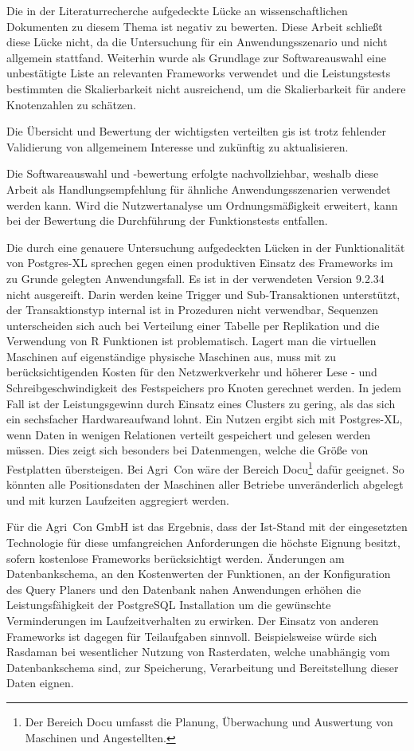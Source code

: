 Die in der Literaturrecherche aufgedeckte Lücke an wissenschaftlichen Dokumenten zu diesem Thema ist negativ zu bewerten.
Diese Arbeit schließt diese Lücke nicht, da die Untersuchung für ein Anwendungsszenario und nicht allgemein stattfand.
Weiterhin wurde als Grundlage zur Softwareauswahl eine unbestätigte Liste an relevanten Frameworks verwendet und die Leistungstests bestimmten die Skalierbarkeit nicht ausreichend, um  die Skalierbarkeit für andere Knotenzahlen zu schätzen.

Die Übersicht und Bewertung der wichtigsten verteilten \Gls{gis} ist trotz fehlender Validierung von allgemeinem Interesse und zukünftig zu aktualisieren.

Die Softwareauswahl und -bewertung erfolgte nachvollziehbar, weshalb diese Arbeit als Handlungsempfehlung für ähnliche Anwendungsszenarien verwendet werden kann.
Wird die Nutzwertanalyse um Ordnungsmäßigkeit erweitert, kann bei der Bewertung die Durchführung der Funktionstests entfallen.

Die durch eine genauere Untersuchung aufgedeckten Lücken in der Funktionalität von Postgres-XL sprechen gegen einen produktiven Einsatz des Frameworks im zu Grunde gelegten Anwendungsfall.
Es ist in der verwendeten Version 9.2.34 nicht ausgereift.
Darin werden keine Trigger und Sub-Transaktionen unterstützt, der Transaktionstyp internal ist in Prozeduren nicht verwendbar, Sequenzen unterscheiden sich auch bei Verteilung einer Tabelle per Replikation und die Verwendung von R Funktionen ist problematisch.
Lagert man die virtuellen Maschinen auf eigenständige physische Maschinen aus, muss mit zu berücksichtigenden Kosten für den Netzwerkverkehr und höherer Lese - und Schreibgeschwindigkeit des Festspeichers pro Knoten gerechnet werden.
In jedem Fall ist der Leistungsgewinn durch Einsatz eines Clusters zu gering, als das sich ein sechsfacher Hardwareaufwand lohnt.
Ein Nutzen ergibt sich mit Postgres-XL, wenn Daten in wenigen Relationen verteilt gespeichert und gelesen werden müssen.
Dies zeigt sich besonders bei Datenmengen, welche die Größe von Festplatten übersteigen.
Bei Agri~Con wäre der Bereich Docu\footnote{Der Bereich Docu umfasst die Planung, Überwachung und Auswertung von Maschinen und Angestellten.} dafür geeignet.
So könnten alle Positionsdaten der Maschinen aller Betriebe unveränderlich abgelegt und mit kurzen Laufzeiten aggregiert werden.

Für die Agri~Con GmbH ist das Ergebnis, dass der Ist-Stand mit der eingesetzten Technologie für diese umfangreichen Anforderungen die höchste Eignung besitzt, sofern kostenlose Frameworks berücksichtigt werden.
Änderungen am Datenbankschema, an den Kostenwerten der Funktionen, an der Konfiguration des Query Planers und den Datenbank nahen Anwendungen erhöhen die Leistungsfähigkeit der PostgreSQL Installation um die gewünschte Verminderungen im Laufzeitverhalten zu erwirken.
Der Einsatz von anderen Frameworks ist dagegen für Teilaufgaben sinnvoll.
Beispielsweise würde sich Rasdaman bei wesentlicher Nutzung von Rasterdaten, welche unabhängig vom Datenbankschema sind, zur Speicherung, Verarbeitung und Bereitstellung dieser Daten eignen.


